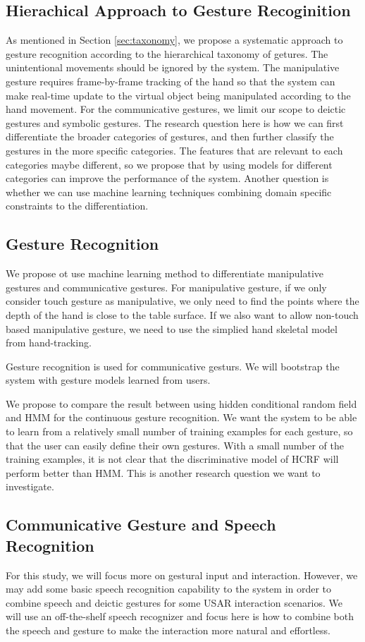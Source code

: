 \subsection{Hierachical Approach to Gesture Recoginition}
As mentioned in Section \ref{sec:taxonomy}, we propose a systematic approach to
gesture recognition according to the hierarchical taxonomy of getures. The
unintentional movements should be ignored by the system. The manipulative
gesture requires frame-by-frame tracking of the hand so that the system can make
real-time update to the virtual object being manipulated according to the hand
movement. For the communicative gestures, we limit our scope to deictic gestures
and symbolic gestures. The research question here is how we can first
differentiate the broader categories of gestures, and then further classify the
gestures in the more specific categories. The features that are relevant to each
categories maybe different, so we propose that by using models for different
categories can improve the performance of the system. Another question is
whether we can use machine learning techniques combining domain specific
constraints to the differentiation.

\subsection{Gesture Recognition}
We propose ot use machine learning method to differentiate
manipulative gestures and communicative gestures. For manipulative gesture, if
we only consider touch gesture as manipulative, we only need to find the points
where the depth of the hand is close to the table surface. If we also want to
allow non-touch based manipulative gesture, we need to use the simplied hand
skeletal model from hand-tracking. 

Gesture recognition is used for communicative
gesturs. We will bootstrap the system with gesture models learned from users.

We propose to compare the result between using hidden conditional random field
and HMM for the continuous gesture recognition. We want the system to be able to
learn from a relatively small number of training examples for each gesture, so
that the user can easily define their own gestures. With a small number of the
training examples, it is not clear that the discriminative model of HCRF will
perform better than HMM. This is another research question we want to
investigate.

\subsection{Communicative Gesture and Speech Recognition} 
For this study, we will focus more on gestural input and interaction. 
However, we may add some basic speech recognition capability to the system in order to combine speech and
deictic gestures for some USAR interaction scenarios. We will use an
off-the-shelf speech recognizer and focus here is how to combine both the speech
and gesture to make the interaction more natural and effortless.

